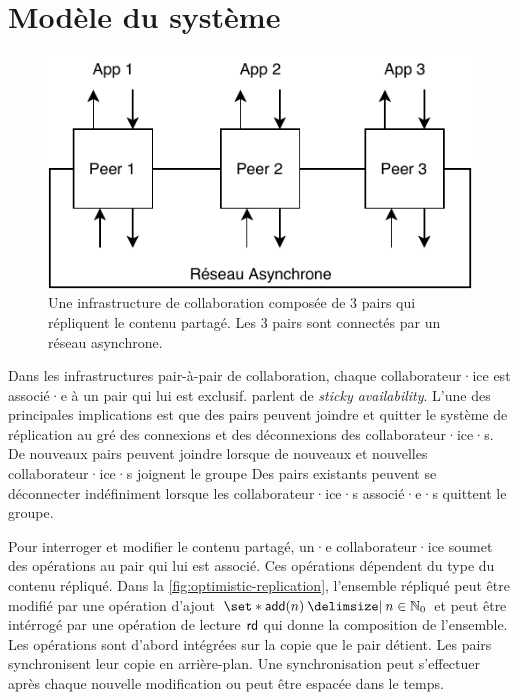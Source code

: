 

\section{Modèle du système}

\begin{figure}[htb]
\centering
\includegraphics{fig/impl.pdf}
\caption[Modèle du système]{Une infrastructure de collaboration composée de 3 pairs qui répliquent le contenu partagé. Les 3 pairs sont connectés par un réseau asynchrone.}\label{fig:collab-system}
\end{figure}

Dans les infrastructures pair-à-pair de collaboration, chaque collaborateur·ice est associé·e à un pair qui lui est exclusif.
\textcite{guerraoui_2016_tradeoffs-replication} parlent de \emph{sticky availability}.
L'une des principales implications est que des pairs peuvent joindre et quitter le système de réplication au gré des connexions et des déconnexions des collaborateur·ice·s.
De nouveaux pairs peuvent joindre lorsque de nouveaux et nouvelles collaborateur·ice·s joignent le groupe
Des pairs existants peuvent se déconnecter indéfiniment lorsque les collaborateur·ice·s associé·e·s quittent le groupe.

Pour interroger et modifier le contenu partagé, un·e collaborateur·ice soumet des opérations au pair qui lui est associé.
Ces opérations dépendent du type du contenu répliqué.
Dans la \autoref{fig:optimistic-replication}, l'ensemble répliqué peut être modifié par une opération d'ajout $\set*{\trm{add}(n) \given n \in \mathbb{N}_0}$ et peut être intérrogé par une opération de lecture $\operatorname{\mathsf{rd}}$ qui donne la composition de l'ensemble.
Les opérations sont d'abord intégrées sur la copie que le pair détient.
Les pairs synchronisent leur copie en arrière-plan.
Une synchronisation peut s'effectuer après chaque nouvelle modification ou peut être espacée dans le temps.


